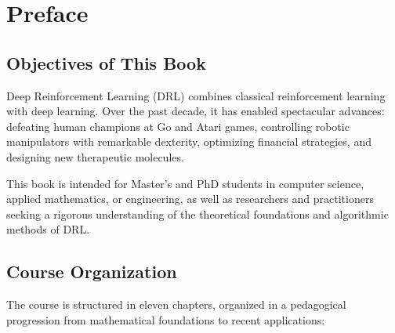 \chapter*{Preface}

\section*{Objectives of This Book}

Deep Reinforcement Learning (DRL) combines classical reinforcement learning with
deep learning. Over the past decade, it has enabled spectacular advances:
defeating human champions at Go and Atari games, controlling robotic manipulators
with remarkable dexterity, optimizing financial strategies, and designing new
therapeutic molecules.

This book is intended for Master's and PhD students in computer science, applied
mathematics, or engineering, as well as researchers and practitioners seeking a
rigorous understanding of the theoretical foundations and algorithmic methods of DRL.

\section*{Course Organization}

The course is structured in eleven chapters, organized in a pedagogical progression
from mathematical foundations to recent applications:

